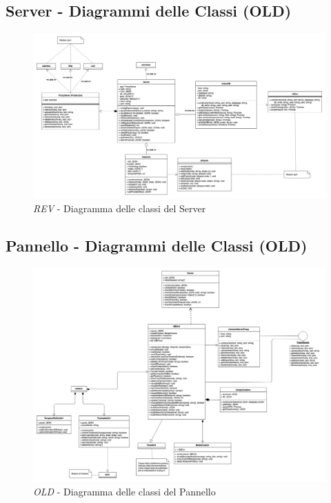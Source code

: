 \begin{landscape}
	\subsection{Server - Diagrammi delle Classi (OLD)}
	\begin{figure}[H]
		\begin{center}
			\includegraphics[scale=0.22]{./images/serverClassi.png} 
		\end{center}
		\caption{\textit{REV} - Diagramma delle classi del Server}
	\end{figure}
\end{landscape}

\begin{landscape}
	\subsection{Pannello - Diagrammi delle Classi (OLD)}
\begin{figure}[H]
	\begin{center}
		\includegraphics[scale=0.22]{./images/panelClassiv2.png} 
	\end{center}
	\caption{\textit{OLD} - Diagramma delle classi del Pannello}
\end{figure}
\end{landscape}
